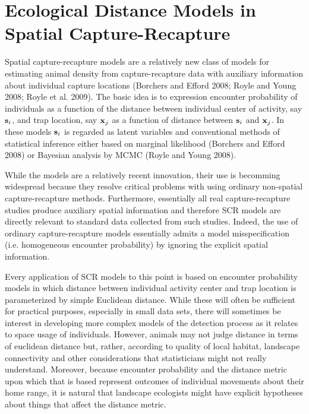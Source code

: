 \chapter{
Ecological Distance Models in Spatial Capture-Recapture
}
\label{chapt.implicit}


\vspace{.3in}


Spatial capture-recapture models are a relatively new class of models for estimating animal density
from capture-recapture data with auxiliary information about individual capture locations
(Borchers and Efford 2008; Royle and Young 2008; Royle et al. 2009). 
The basic idea is to expression encounter probability of individuals as a function of the
distance between individual center of activity, say ${\bf s}_{i}$, and trap location, say
${\bf x}_{j}$ as a function of distance between ${\bf s}_{i}$ and ${\bf x}_{j}$.
In these models ${\bf s}_{i}$ is regarded as latent variables and conventional methods
of statistical inference either based on marginal likelihood (Borchers and Efford 2008) or
Bayesian analysis by MCMC (Royle and Young 2008).

While the models are a relatively recent innovation, their use is becomming widespread because
they resolve critical problems with using ordinary non-spatial capture-recapture methods.
Furthermore, 
essentially all real capture-recapture studies produce auxiliary spatial information and therefore
SCR models are directly relevant to standard data collected from such studies. Indeed,
the use of ordinary capture-recapture models essentially admits a model misspecification 
(i.e. homogeneous encounter probability) by ignoring the explicit spatial information.

Every application of SCR models to this point is based on encounter probability models
in which distance between individual activity center and trap location is parameterized
by simple Euclidean distance.
While these will often be sufficient for
practical purposes, especially in small data sets, there will
sometimes be interest in developing more complex models of the
detection process as it relates to space usage of individuals.  
However, animals may not
judge distance in terms of euclidean distance but, rather, according
to quality of local habitat, landscape connectivity and other considerations that statisticians
might not really understand. Moreover, because encounter probability and the
distance metric upon which that is based represent outcomes of individual movements about their
home range, it is natural that 
landscape ecologists might have explicit
hypotheses about things that affect the distance metric. 

